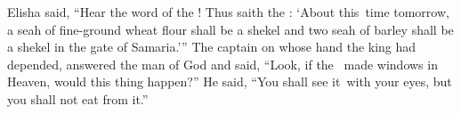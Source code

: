 
\begin{inparaenum}
   Elisha said, ``Hear the word of the \lord! Thus saith the \lord: `About this\understood{}\ time tomorrow, a seah of fine-ground wheat flour shall be a shekel and two seah of barley shall be a shekel in the gate of Samaria.'\thinspace''%
   The captain on whose hand the king had depended, answered the man of God and said, ``Look, if the \lord\ made windows in Heaven, would this thing happen?'' He said, ``You shall see it\understood{}\ with your eyes, but you shall not eat from it.''%


\end{inparaenum}
